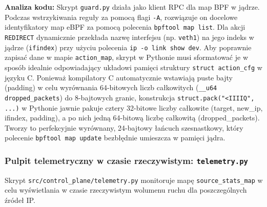 \documentclass[11pt,a4paper]{article}
\begin{document}
\noindent \textbf{Analiza kodu:} Skrypt \texttt{guard.py} działa jako klient RPC dla map BPF w jądrze. Podczas wstrzykiwania reguły za pomocą flagi \texttt{-A}, rozwiązuje on docelowe identyfikatory map eBPF za pomocą polecenia \texttt{bpftool map list}. Dla akcji \texttt{REDIRECT} dynamicznie przekłada nazwę interfejsu (np. \texttt{veth1}) na jego indeks w jądrze (\texttt{ifindex}) przy użyciu polecenia \texttt{ip -o link show dev}. Aby poprawnie zapisać dane w mapie \texttt{action\_map}, skrypt w Pythonie musi sformatować je w sposób idealnie odpowiadający układowi pamięci struktury \texttt{struct action\_cfg} w języku C. Ponieważ kompilatory C automatycznie wstawiają puste bajty (padding) w celu wyrównania 64-bitowych liczb całkowitych (\texttt{\_\_u64 dropped\_packets}) do 8-bajtowych granic, konstrukcja \texttt{struct.pack("<IIIIQ", ...)} w Pythonie jawnie pakuje cztery 32-bitowe liczby całkowite (target, new\_ip, ifindex, padding), a po nich jedną 64-bitową liczbę całkowitą (dropped\_packets). Tworzy to perfekcyjnie wyrównany, 24-bajtowy łańcuch szesnastkowy, który polecenie \texttt{bpftool map update} bezbłędnie umieszcza w pamięci jądra.

\subsubsection{Pulpit telemetryczny w czasie rzeczywistym: \texttt{telemetry.py}}

Skrypt \texttt{src/control\_plane/telemetry.py} monitoruje mapę \texttt{source\_stats\_map} w celu wyświetlania w czasie rzeczywistym wolumenu ruchu dla poszczególnych źródeł IP.
\end{document}
